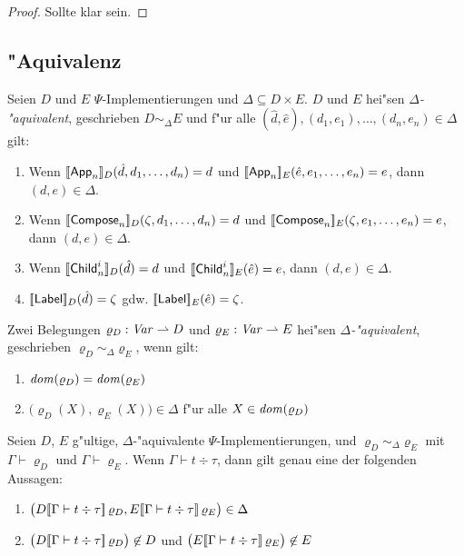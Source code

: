 \documentclass[%
  12pt,%
  a4paper,%
]{article}
\newcommand{\Tj}[3]{{#1}\vdash{#2}\div{#3}}
\begin{document}
\begin{proof}
  Sollte klar sein.
\end{proof}

\subsection*{"Aquivalenz}

\begin{definition} \label{def:Aequivalenz_von_Implementierungen}
  Seien $D$ und $E$ $\Psi$-Implementierungen und $\Delta \subseteq D \times E$. $D$ und $E$ hei"sen
  \emph{$\Delta$-"aquivalent}, geschrieben $D \sim_\Delta E$ und f"ur alle
  $(\hat{d},\hat{e}),(d_1,e_1),\ldots,(d_n,e_n) \in \Delta$ gilt:
  \begin{enumerate}
  \item Wenn $[\![\mathsf{App}_n]\!]_D(\hat{d},d_1,\ldots,d_n) = d$ und $[\![\mathsf{App}_n]\!]_E(\hat{e},e_1,\ldots,e_n) = e$,
    dann $(d,e) \in \Delta$.
  \item Wenn $[\![\mathsf{Compose}_n]\!]_D(\zeta,d_1,\ldots,d_n) = d$ und $[\![\mathsf{Compose}_n]\!]_E(\zeta,e_1,\ldots,e_n) = e$,
    dann $(d,e) \in \Delta$.
  \item Wenn $[\![\mathsf{Child}_n^i]\!]_D(\hat{d}) = d$ und $[\![\mathsf{Child}_n^i]\!]_E(\hat{e}) = e$,
    dann $(d,e) \in \Delta$.
  \item $[\![\mathsf{Label}]\!]_D(\hat{d}) = \zeta$ gdw. $[\![\mathsf{Label}]\!]_E(\hat{e}) = \zeta$.
  \end{enumerate}
\end{definition}
Zwei Belegungen $\varrho_D: \mathit{Var} \rightharpoonup D$ und $\varrho_E: \mathit{Var} \rightharpoonup E$ hei"sen \emph{$\Delta$-"aquivalent},
geschrieben $\varrho_D \sim_\Delta \varrho_E$, wenn gilt:
\begin{enumerate}
\item $\mathit{dom}(\varrho_D) = \mathit{dom}(\varrho_E)$
\item $\bigl(\varrho_D(X),\varrho_E(X)\bigr) \in \Delta$ f"ur alle $X \in \mathit{dom}(\varrho_D)$
\end{enumerate}

\begin{lemma}
  Seien $D$, $E$ g"ultige, $\Delta$-"aquivalente $\Psi$-Implementierungen,
  und $\varrho_D \sim_\Delta \varrho_E$ mit $\Gamma \vdash \varrho_D$ und $\Gamma \vdash \varrho_E$.
  Wenn $\Tj{\Gamma}{t}{\tau}$, dann gilt genau eine der folgenden Aussagen:
  \begin{enumerate}
  \item
    $\bigl( D\sem{\Tj{\Gamma}{t}{\tau}}\,\varrho_D, E\sem{\Tj{\Gamma}{t}{\tau}}\,\varrho_E \bigr) \in \Delta$
  \item
    $\bigl( D\sem{\Tj{\Gamma}{t}{\tau}}\,\varrho_D \bigr) \not\in D$
    und $\bigl( E\sem{\Tj{\Gamma}{t}{\tau}}\,\varrho_E \bigr) \not\in E$
  \end{enumerate}
\end{lemma}
\end{document}
